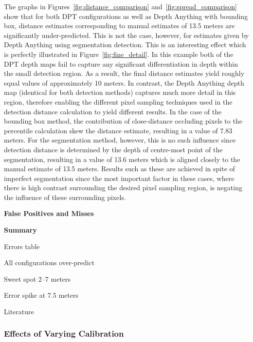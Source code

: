 The graphs in Figures~\ref{fig:distance_comparison} and~\ref{fig:spread_comparison} show that
for both DPT configurations as well as Depth Anything with bounding box, distance estimates
corresponding to manual estimates of 13.5 meters are significantly under-predicted.
This is not the case, however, for estimates given by Depth Anything using segmentation detection.
This is an interesting effect which is perfectly illustrated in Figure~\ref{fig:fine_detail}.
In this example both of the DPT depth maps fail to capture any significant differentiation in
depth within the small detection region.
As a result, the final distance estimates yield roughly equal values of approximately 10 meters.
In contrast, the Depth Anything depth map (identical for both detection methods) captures
much more detail in this region, therefore enabling the different pixel sampling techniques used
in the detection distance calculation to yield different results.
In the case of the bounding box method, the contribution of close-distance occluding pixels to the
percentile calculation skew the distance estimate, resulting in a value of 7.83 meters.
For the segmentation method, however, this is no such influence since detection distance is
determined by the depth of centre-most point of the segmentation, resulting in a value of 13.6
meters which is aligned closely to the manual estimate of 13.5 meters.
Results such as these are achieved in spite of imperfect segmentation since the most important
factor in these cases, where there is high contrast surrounding the desired pixel sampling region,
is negating the influence of these surrounding pixels.

\vspace{5mm}
\textbf{False Positives and Misses}

\vspace{5mm}
\textbf{Summary}

Errors table

All configurations over-predict

Sweet spot 2–7 meters

Error spike at 7.5 meters

Literature

\clearpage

\subsubsection{Effects of Varying Calibration}